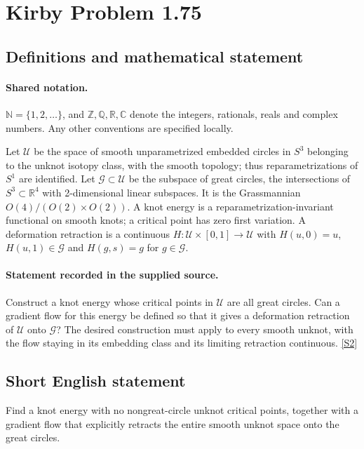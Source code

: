 \documentclass[11pt]{article}
\newcommand{\sref}[2]{\hyperlink{source:#1:#2}{[S#2]}}
\begin{document}
\section{Kirby Problem 1.75}\label{statement}

\subsection{Definitions and mathematical statement}

\paragraph{Shared notation.}$\mathbb N=\{1,2,\ldots\}$, and $\mathbb Z,\mathbb Q,\mathbb R,\mathbb C$ denote the integers, rationals, reals and complex numbers. Any other conventions are specified locally.


Let $\mathcal U$ be the space of smooth unparametrized embedded circles in $S^3$ belonging to the unknot isotopy class, with the smooth topology; thus reparametrizations of $S^1$ are identified. Let $\mathcal G\subset\mathcal U$ be the subspace of great circles, the intersections of $S^3\subset\mathbb R^4$ with 2-dimensional linear subspaces. It is the Grassmannian $O(4)/(O(2)\times O(2))$. A knot energy is a reparametrization-invariant functional on smooth knots; a critical point has zero first variation. A deformation retraction is a continuous $H:\mathcal U\times[0,1]\to\mathcal U$ with $H(u,0)=u$, $H(u,1)\in\mathcal G$ and $H(g,s)=g$ for $g\in\mathcal G$.
\paragraph{Statement recorded in the supplied source.}
Construct a knot energy whose critical points in $\mathcal U$ are all great circles. Can a gradient flow for this energy be defined so that it gives a deformation retraction of $\mathcal U$ onto $\mathcal G$? The desired construction must apply to every smooth unknot, with the flow staying in its embedding class and its limiting retraction continuous. \sref{statement}{2}

\subsection{Short English statement}
Find a knot energy with no nongreat-circle unknot critical points, together with a gradient flow that explicitly retracts the entire smooth unknot space onto the great circles.
\end{document}
